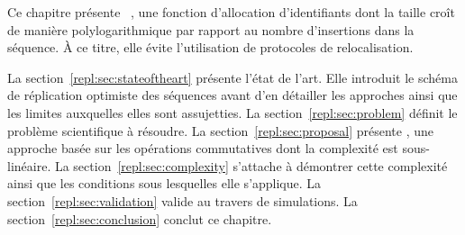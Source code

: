 Ce chapitre présente \LSEQ~\cite{nedelec2013concurrency, nedelec2013lseq}, une
fonction d'allocation d'identifiants dont la taille croît de manière
polylogarithmique par rapport au nombre d'insertions dans la séquence. À ce
titre, elle évite l'utilisation de protocoles de relocalisation.

La section~\ref{repl:sec:stateoftheart} présente l'état de l'art. Elle introduit
le schéma de réplication optimiste des séquences avant d'en détailler les
approches ainsi que les limites auxquelles elles sont assujetties.  La
section~\ref{repl:sec:problem} définit le problème scientifique à résoudre. La
section~\ref{repl:sec:proposal} présente \LSEQ, une approche basée sur les
opérations commutatives dont la complexité est sous-linéaire. La
section~\ref{repl:sec:complexity} s'attache à démontrer cette complexité ainsi
que les conditions sous lesquelles elle s'applique. La
section~\ref{repl:sec:validation} valide \LSEQ au travers de simulations. La
section~\ref{repl:sec:conclusion} conclut ce chapitre.


